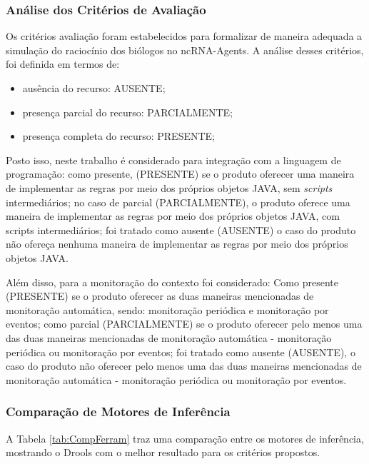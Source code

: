 \subsubsection{Análise dos Crit\'erios de Avalia\c{c}\~ao} \label{sec:DescAvaliMoteres}


Os crit\'erios avalia\c{c}\~ao foram estabelecidos para formalizar de maneira adequada a simula\c{c}\~ao do racioc\'inio dos bi\'ologos no ncRNA-Agents. A análise desses crit\'erios, foi definida em termos de:

\begin{itemize}
\item aus\^encia do recurso: AUSENTE;
\item presen\c{c}a parcial do recurso: PARCIALMENTE;
\item presen\c{c}a completa do recurso: PRESENTE;
\end{itemize}

Posto isso, neste trabalho \'e considerado para integra\c{c}\~ao com a linguagem de programa\c{c}\~ao: como presente,  (PRESENTE) se o produto oferecer uma maneira de implementar as regras por meio dos pr\'oprios objetos JAVA, sem \textit{scripts} intermedi\'arios; no caso de parcial (PARCIALMENTE), o produto oferece uma maneira de implementar as regras por meio dos pr\'oprios objetos JAVA, com scripts intermedi\'arios; foi tratado como ausente (AUSENTE) o caso do produto n\~ao ofere\c{c}a nenhuma maneira de implementar as regras por meio dos pr\'oprios objetos JAVA.


Al\'em disso, para a monitora\c{c}\~ao do contexto foi considerado: Como presente (PRESENTE) se o produto oferecer as duas maneiras mencionadas de monitora\c{c}\~ao autom\'atica, sendo: monitora\c{c}\~ao peri\'odica e monitora\c{c}\~ao por eventos; como parcial (PARCIALMENTE) se o produto oferecer pelo menos uma das
duas maneiras mencionadas de monitora\c{c}\~ao autom\'atica - monitora\c{c}\~ao peri\'odica ou monitora\c{c}\~ao por eventos; foi tratado como ausente (AUSENTE), o caso do produto n\~ao oferecer pelo menos uma das duas maneiras mencionadas de monitora\c{c}\~ao autom\'atica - monitora\c{c}\~ao peri\'odica ou monitora\c{c}\~ao por eventos. 

\subsubsection{Comparação de Motores de Inferência}

A Tabela \ref{tab:CompFerram} traz uma comparação entre os motores de inferência, mostrando o Drools com o melhor resultado para os critérios propostos.

